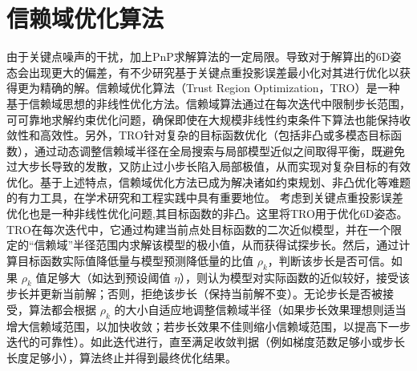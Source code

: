 \section{信赖域优化算法}

由于关键点噪声的干扰，加上PnP求解算法的一定局限。导致对于解算出的6D姿态会出现更大的偏差，有不少研究基于关键点重投影误差最小化对其进行优化以获得更为精确的解\cite{10297555,guo2024joint}。信赖域优化算法（Trust Region Optimization，TRO）是一种基于信赖域思想的非线性优化方法。信赖域算法通过在每次迭代中限制步长范围，可可靠地求解约束优化问题，确保即使在大规模非线性约束条件下算法也能保持收敛性和高效性​\cite{wen2024augmented}。另外，TRO针对复杂的目标函数优化（包括非凸或多模态目标函数），通过动态调整信赖域半径在全局搜索与局部模型近似之间取得平衡，既避免过大步长导致的发散，又防止过小步长陷入局部极值，从而实现对复杂目标的有效优化​\cite{asmtr}。基于上述特点，信赖域优化方法已成为解决诸如约束规划、非凸优化等难题的有力工具，在学术研究和工程实践中具有重要地位。
考虑到关键点重投影误差优化也是一种非线性优化问题,其目标函数的非凸。这里将TRO用于优化6D姿态。TRO在每次迭代中，它通过构建当前点处目标函数的二次近似模型，并在一个限定的“信赖域”半径范围内求解该模型的极小值，从而获得试探步长。然后，通过计算目标函数实际值降低量与模型预测降低量的比值 $\rho_k$，判断该步长是否可信。如果 $\rho_k$ 值足够大（如达到预设阈值 $\eta$），则认为模型对实际函数的近似较好，接受该步长并更新当前解；否则，拒绝该步长（保持当前解不变）。无论步长是否被接受，算法都会根据 $\rho_k$ 的大小自适应地调整信赖域半径（如果步长效果理想则适当增大信赖域范围，以加快收敛；若步长效果不佳则缩小信赖域范围，以提高下一步迭代的可靠性）。如此迭代进行，直至满足收敛判据（例如梯度范数足够小或步长长度足够小），算法终止并得到最终优化结果。



